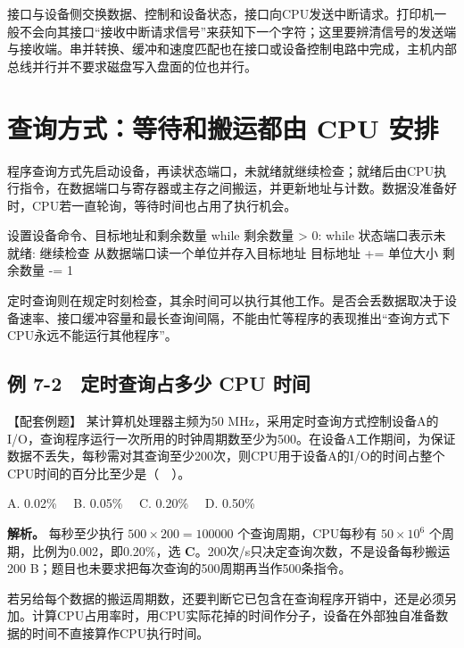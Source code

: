 接口与设备侧交换数据、控制和设备状态，接口向CPU发送中断请求。打印机一般不会向其接口``接收中断请求信号''来获知下一个字符；这里要辨清信号的发送端与接收端。串并转换、缓冲和速度匹配也在接口或设备控制电路中完成，主机内部总线并行并不要求磁盘写入盘面的位也并行。

\section{查询方式：等待和搬运都由 CPU 安排}\label{CO07-query}

程序查询方式先启动设备，再读状态端口，未就绪就继续检查；就绪后由CPU执行指令，在数据端口与寄存器或主存之间搬运，并更新地址与计数。数据没准备好时，CPU若一直轮询，等待时间也占用了执行机会。

\par\medskip\noindent\begin{minipage}{\linewidth}
\begin{codeblock}[language={}]
设置设备命令、目标地址和剩余数量
while 剩余数量 > 0:
    while 状态端口表示未就绪:
        继续检查
    从数据端口读一个单位并存入目标地址
    目标地址 += 单位大小
    剩余数量 -= 1
\end{codeblock}
\end{minipage}\par\medskip

定时查询则在规定时刻检查，其余时间可以执行其他工作。是否会丢数据取决于设备速率、接口缓冲容量和最长查询间隔，不能由忙等程序的表现推出``查询方式下CPU永远不能运行其他程序''。

\subsection{例 7-2　定时查询占多少 CPU 时间}\label{CO07-example-2}

【配套例题】 某计算机处理器主频为50 MHz，采用定时查询方式控制设备A的I/O，查询程序运行一次所用的时钟周期数至少为500。在设备A工作期间，为保证数据不丢失，每秒需对其查询至少200次，则CPU用于设备A的I/O的时间占整个CPU时间的百分比至少是（　）。

A. 0.02\%　 B. 0.05\%　 C. 0.20\%　 D. 0.50\%

\textbf{解析。} 每秒至少执行 \(500\times200=100000\) 个查询周期，CPU每秒有 \(50\times10^6\) 个周期，比例为0.002，即0.20\%，选 \textbf{C}。200次/s只决定查询次数，不是设备每秒搬运200 B；题目也未要求把每次查询的500周期再当作500条指令。

若另给每个数据的搬运周期数，还要判断它已包含在查询程序开销中，还是必须另加。计算CPU占用率时，用CPU实际花掉的时间作分子，设备在外部独自准备数据的时间不直接算作CPU执行时间。

